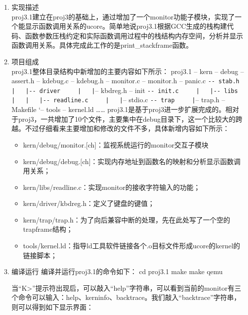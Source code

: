 \begin{enumerate}
\def\labelenumi{\arabic{enumi}.}
\item
  实现描述\\
  proj3.1建立在proj3的基础上，通过增加了一个monitor功能子模块，实现了一个能显示函数调用关系的ucore。简单地说proj3.1根据GCC生成的栈构建代码、函数参数压栈约定和实际函数调用过程中的栈结构内存空间，分析并显示函数调用关系。具体完成此工作的是print\_stackframe函数。
\item
  项目组成\\
  proj3.1整体目录结构中新增加的主要内容如下所示： proj3.1 \textbar{}--
  kern \textbar{} \textbar{}-- debug \textbar{} \textbar{} \textbar{}--
  assert.h \textbar{} \textbar{} \textbar{}-- kdebug.c \textbar{}
  \textbar{} \textbar{}-- kdebug.h \textbar{} \textbar{} \textbar{}--
  monitor.c \textbar{} \textbar{} \textbar{}-- monitor.h \textbar{}
  \textbar{} \textbar{}-- panic.c \textbar{} \textbar{}
  \lstinline!-- stab.h     |   |-- driver     |   |!-- kbdreg.h
  \textbar{} \textbar{}-- init \textbar{} \textbar{}
  \lstinline!-- init.c     |   |-- libs     |   |   |-- readline.c     |   |!--
  stdio.c \textbar{} \lstinline!-- trap     |!-- trap.h \textbar{}--
  Makefile `-- tools \textbar{}-- kernel.ld \ldots{}\ldots{}
  proj3.1是基于proj3进一步扩展完成的。相对于proj3，一共增加了10个文件，主要集中在debug目录下，这一个比较大的跨越。不过仔细看来主要增加和修改的文件不多，具体新增内容如下所示：

  \begin{itemize}
  \item
    kern/debug/monitor.{[}ch{]}：监视系统运行的monitor交互子模块
  \item
    kern/debug/debug.{[}ch{]}：实现内存地址到函数名的映射和分析显示函数调用关系；
  \item
    kern/libs/readline.c：实现monitor的接收字符输入的功能；
  \item
    kern/driver/kbdreg.h：定义了键盘的键值；
  \item
    kern/trap/trap.h：为了向后兼容中断的处理，先在此处写了一个空的trapframe结构；
  \item
    tools/kernel.ld：指导ld工具软件链接各个.o目标文件形成ucore的kernel的链接脚本；
  \end{itemize}
\item
  编译运行 编译并运行proj3.1的命令如下： cd proj3.1 make make qemu

  当``K\textgreater{}''提示符出现后，可以敲入``help''字符串，可以看到当前的monitor有三个命令可以输入：help、kerninfo、backtrace。我们敲入``backtrace''字符串，则可以得到如下显示界面：


\end{enumerate}
